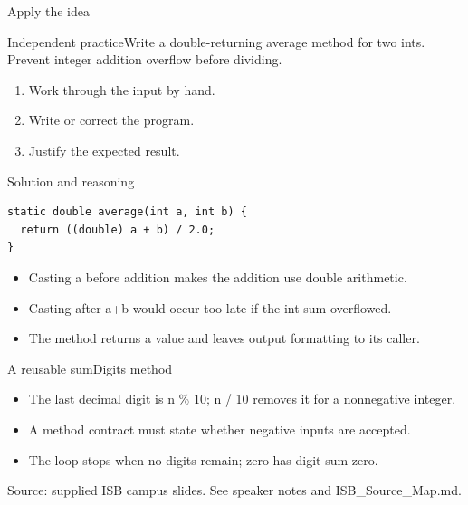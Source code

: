 \documentclass[10pt,aspectratio=169]{beamer}
\begin{document}
\begin{frame}[fragile,t]{Apply the idea}
\begin{alertblock}{Independent practice}Write a double-returning average method for two ints. Prevent integer addition overflow before dividing.\end{alertblock}\vspace{3mm}\begin{enumerate}\item Work through the input by hand.\item Write or correct the program.\item Justify the expected result.\end{enumerate}
\end{frame}

\begin{frame}[fragile,t]{Solution and reasoning}
\begin{lstlisting}
static double average(int a, int b) {
  return ((double) a + b) / 2.0;
}
\end{lstlisting}\vspace{1mm}\small\begin{itemize}
\item Casting a before addition makes the addition use double arithmetic.
\item Casting after a+b would occur too late if the int sum overflowed.
\item The method returns a value and leaves output formatting to its caller.
\end{itemize}
\end{frame}

\begin{frame}[fragile,t]{A reusable sumDigits method}
\begin{itemize}
\item The last decimal digit is n \% 10; n / 10 removes it for a nonnegative integer.
\item A method contract must state whether negative inputs are accepted.
\item The loop stops when no digits remain; zero has digit sum zero.
\end{itemize}
\vspace{3mm}\footnotesize\textcolor{accent}{Source: supplied ISB campus slides. See speaker notes and ISB\_Source\_Map.md.}
\end{frame}
\end{document}

